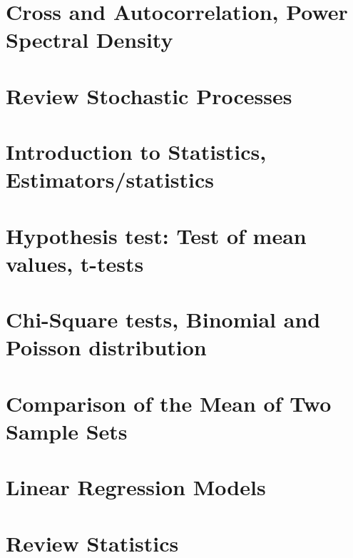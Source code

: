 \documentclass[12pt,a4paper,danish]{book}
\begin{document}
\chapter{Cross and Autocorrelation, Power Spectral Density}

\chapter{Review Stochastic Processes}

\chapter{Introduction to Statistics, Estimators/statistics}

\chapter{ Hypothesis test: Test of mean values, t-tests}

\chapter{Chi-Square tests, Binomial and Poisson distribution}

\chapter{Comparison of the Mean of Two Sample Sets}

\chapter{Linear Regression Models}

\chapter{Review Statistics}
\end{document}
